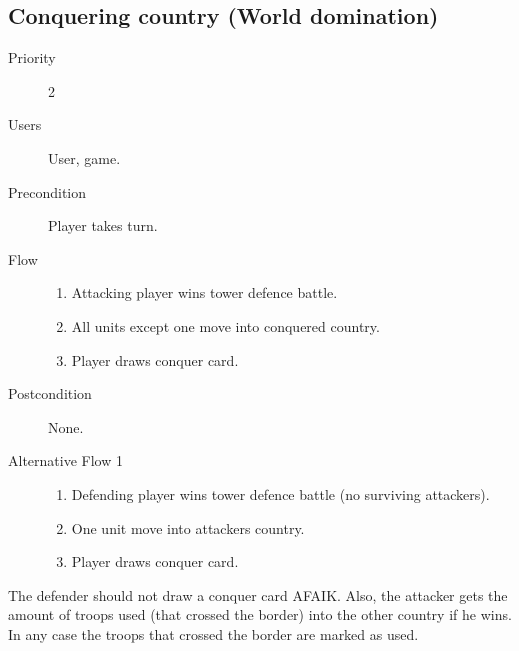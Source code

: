 \documentclass[12pt,a4paper]{article}
\begin{document}
\subsection{Conquering country (World domination)}
\begin{description}
\item[Priority] 2
\item[Users] User, game.
\item[Precondition] Player takes turn.
\item[Flow]\mbox{}
  \begin{enumerate}
  \item Attacking player wins tower defence battle.
  \item All units except one move into conquered country.
  \item Player draws conquer card.
  \end{enumerate}
\item[Postcondition] None. 
\item[Alternative Flow 1]\mbox{}
  \begin{enumerate}
  \item Defending player wins tower defence battle (no surviving
    attackers).
  \item One unit move into attackers country.
  \item Player draws conquer card.
  \end{enumerate}
\end{description}

\begin{todo}
  The defender should not draw a conquer card AFAIK. Also, the attacker
  gets the amount of troops used (that crossed the border) into the
  other country if he wins. In any case the troops that crossed the
  border are marked as used.
\end{todo}
\end{document}
